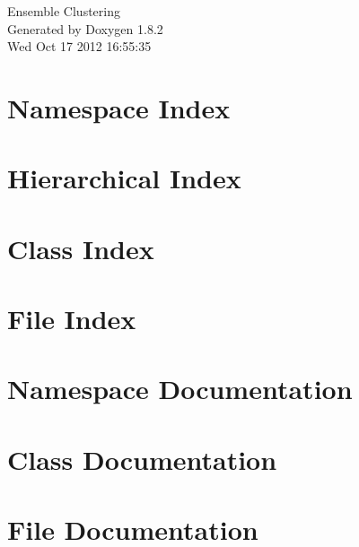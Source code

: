 \documentclass{book}
\begin{document}
\hypersetup{pageanchor=false,citecolor=blue}
\begin{titlepage}
\vspace*{7cm}
\begin{center}
{\Large Ensemble Clustering }\\
\vspace*{1cm}
{\large Generated by Doxygen 1.8.2}\\
\vspace*{0.5cm}
{\small Wed Oct 17 2012 16:55:35}\\
\end{center}
\end{titlepage}
\clearemptydoublepage
{}
\tableofcontents
\clearemptydoublepage
{}
\hypersetup{pageanchor=true,citecolor=blue}
\chapter{Namespace Index}

\chapter{Hierarchical Index}

\chapter{Class Index}

\chapter{File Index}

\chapter{Namespace Documentation}

\chapter{Class Documentation}









\chapter{File Documentation}















\printindex
\end{document}
